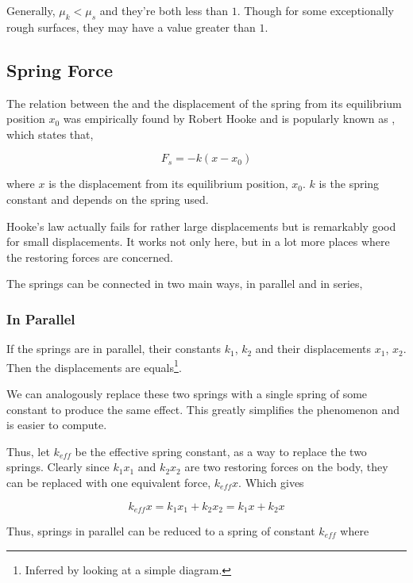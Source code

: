 Generally, \(\mu_k < \mu_s\) and they're both less than \(1\). Though for some exceptionally rough surfaces, they
may have a value greater than \(1\).

\subsection{Spring Force}

The relation between the  and the displacement of the spring
from its equilibrium position \(x_0\) was empirically found by Robert Hooke and is popularly 
known as , which states that,

\begin{equation}
    F_s = -k(x - x_0)
\end{equation}

where \(x\) is the displacement from its equilibrium position, \(x_0\). \(k\) is the
spring constant and depends on the spring used. 

Hooke's law actually fails for rather large displacements but is remarkably good for 
small displacements. It works not only here, but in a lot more places where the restoring forces 
are concerned.

The springs can be connected in two main ways, in parallel and in series, 

\subsubsection{In Parallel}

If the springs are in parallel, their constants \(k_1\), \(k_2\) and their 
displacements \(x_1\), \(x_2\). Then the displacements are equals\footnote{Inferred by 
looking at a simple diagram.}. 

We can analogously replace these two springs with a single spring of some constant 
to produce the same effect. This greatly simplifies the phenomenon and is easier to compute.

Thus, let \(k_{eff}\) be the effective spring constant, as a way to replace the two
springs. 
Clearly since \(k_1x_1\) and \(k_2x_2\) are two restoring forces on the body, they can be replaced with one equivalent force, 
\(k_{eff}x\). Which gives 

\begin{equation*}
    k_{eff}x = k_1x_1 + k_2x_2 = k_1x + k_2x
\end{equation*}

Thus, springs in parallel can be reduced to a spring of constant \(k_{eff}\) where

